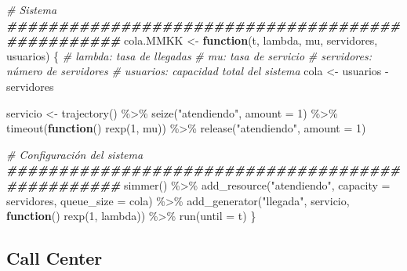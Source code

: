\documentclass[
]{book}
\newenvironment{Shaded}{\begin{snugshade}}{\end{snugshade}}
\newcommand{\AttributeTok}[1]{\textcolor[rgb]{0.77,0.63,0.00}{#1}}
\newcommand{\CommentTok}[1]{\textcolor[rgb]{0.56,0.35,0.01}{\textit{#1}}}
\newcommand{\ControlFlowTok}[1]{\textcolor[rgb]{0.13,0.29,0.53}{\textbf{#1}}}
\newcommand{\DecValTok}[1]{\textcolor[rgb]{0.00,0.00,0.81}{#1}}
\newcommand{\DocumentationTok}[1]{\textcolor[rgb]{0.56,0.35,0.01}{\textbf{\textit{#1}}}}
\newcommand{\FunctionTok}[1]{\textcolor[rgb]{0.00,0.00,0.00}{#1}}
\newcommand{\NormalTok}[1]{#1}
\newcommand{\OtherTok}[1]{\textcolor[rgb]{0.56,0.35,0.01}{#1}}
\newcommand{\SpecialCharTok}[1]{\textcolor[rgb]{0.00,0.00,0.00}{#1}}
\newcommand{\StringTok}[1]{\textcolor[rgb]{0.31,0.60,0.02}{#1}}
\theoremstyle{definition}
\theoremstyle{definition}
\theoremstyle{definition}
\theoremstyle{definition}
\theoremstyle{remark}
\begin{document}
\begin{Shaded}
\begin{Highlighting}[]
\CommentTok{\# Sistema}
\DocumentationTok{\#\#\#\#\#\#\#\#\#\#\#\#\#\#\#\#\#\#\#\#\#\#\#\#\#\#\#\#\#\#\#\#\#\#\#\#\#\#\#\#\#\#\#\#\#\#\#\#\#}
\NormalTok{cola.MMKK }\OtherTok{\textless{}{-}} \ControlFlowTok{function}\NormalTok{(t, lambda, mu, servidores, usuarios)}
\NormalTok{\{}
  \CommentTok{\# lambda: tasa de llegadas}
  \CommentTok{\# mu: tasa de servicio}
  \CommentTok{\# servidores: número de servidores}
  \CommentTok{\# usuarios: capacidad total del sistema}
\NormalTok{  cola }\OtherTok{\textless{}{-}}\NormalTok{ usuarios }\SpecialCharTok{{-}}\NormalTok{ servidores}
  
\NormalTok{  servicio }\OtherTok{\textless{}{-}} \FunctionTok{trajectory}\NormalTok{() }\SpecialCharTok{\%\textgreater{}\%}
    \FunctionTok{seize}\NormalTok{(}\StringTok{"atendiendo"}\NormalTok{, }\AttributeTok{amount =} \DecValTok{1}\NormalTok{) }\SpecialCharTok{\%\textgreater{}\%}              
    \FunctionTok{timeout}\NormalTok{(}\ControlFlowTok{function}\NormalTok{() }\FunctionTok{rexp}\NormalTok{(}\DecValTok{1}\NormalTok{, mu)) }\SpecialCharTok{\%\textgreater{}\%}   
    \FunctionTok{release}\NormalTok{(}\StringTok{"atendiendo"}\NormalTok{, }\AttributeTok{amount =} \DecValTok{1}\NormalTok{)               }

  \CommentTok{\# Configuración del sistema }
  \DocumentationTok{\#\#\#\#\#\#\#\#\#\#\#\#\#\#\#\#\#\#\#\#\#\#\#\#\#\#\#\#\#\#\#\#\#\#\#\#\#\#\#\#\#\#\#\#\#\#\#\#\#}
  \FunctionTok{simmer}\NormalTok{() }\SpecialCharTok{\%\textgreater{}\%}
    \FunctionTok{add\_resource}\NormalTok{(}\StringTok{"atendiendo"}\NormalTok{, }\AttributeTok{capacity =}\NormalTok{ servidores, }\AttributeTok{queue\_size =}\NormalTok{ cola) }\SpecialCharTok{\%\textgreater{}\%}           
    \FunctionTok{add\_generator}\NormalTok{(}\StringTok{"llegada"}\NormalTok{, servicio, }\ControlFlowTok{function}\NormalTok{() }\FunctionTok{rexp}\NormalTok{(}\DecValTok{1}\NormalTok{, lambda)) }\SpecialCharTok{\%\textgreater{}\%} 
    \FunctionTok{run}\NormalTok{(}\AttributeTok{until =}\NormalTok{ t)     }
\NormalTok{\}}
\end{Highlighting}
\end{Shaded}

\hypertarget{call-center}{%
\subsection{Call Center}\label{call-center}}
\end{document}
